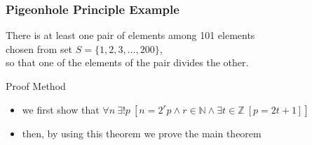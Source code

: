 \documentclass[dvipsnames]{beamer}
\begin{document}
\begin{frame}
  \frametitle{Pigeonhole Principle Example}

  \begin{theorem}
    There is at least one pair of elements among 101 elements\\
    chosen from set $S = \{1,2,3,\dots,200\}$,\\
    so that one of the elements of the pair divides the other.
  \end{theorem}

  \pause
  \begin{block}{Proof Method}
    \begin{itemize}
      \item we first show that
        $\forall n~\exists ! p~
          [n = 2^r p \wedge r \in \mathbb{N}
            \wedge \exists t \in \mathbb Z~[p = 2t + 1]]$\\

      \item then, by using this theorem we prove the main theorem
    \end{itemize}
  \end{block}
\end{frame}
\end{document}
